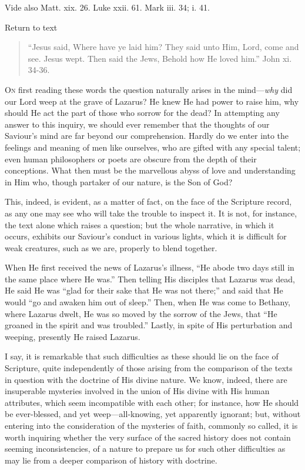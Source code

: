 
Vide also Matt. xix. 26. Luke xxii. 61. Mark iii. 34; i. 41.

Return to text


\begin{quote}

``Jesus said, Where have ye laid him? They said unto Him,
Lord, come and see. Jesus wept. Then said the Jews, Behold how He
loved him.'' John xi. 34-36.

\end{quote}

O\textsc{n} first reading these words the question naturally arises in the
mind—\emph{why} did our Lord weep at the grave of Lazarus? He knew
He had power to raise him, why should He act the part of those who
sorrow for the dead? In attempting any answer to this inquiry, we
should ever remember that the thoughts of our Saviour's mind are far
beyond our comprehension. Hardly do we enter into the feelings and
meaning of men like ourselves, who are gifted with any special talent;
even human philosophers or poets are obscure from the depth of their
conceptions. What then must be the marvellous abyss of love and
understanding in Him who, though partaker of our nature, is the Son of
God?

This, indeed, is evident, as a matter of fact, on the face of the
Scripture record, as any one may see who will take the trouble to
inspect it. It is not, for instance, the text alone which raises a
question; but the whole narrative, in which it occurs, exhibits our
Saviour's conduct in various lights, which it is difficult for weak
creatures, such as we are, properly to blend together.

When He first received the news of Lazarus's illness, ``He
abode two days still in the same place where He was.'' Then
telling His disciples that Lazarus was dead, He said He was ``glad
for their sake that He was not there;'' and said that He would
``go and awaken him out of sleep.'' Then, when He was come to
Bethany, where Lazarus dwelt, He was so moved by the sorrow of the
Jews, that ``He groaned in the spirit and was troubled.''
Lastly, in spite of His perturbation and weeping, presently He raised
Lazarus.

I say, it is remarkable that such difficulties as these should lie
on the face of Scripture, quite independently of those arising from
the comparison of the texts in question with the doctrine of His
divine nature. We know, indeed, there are insuperable mysteries
involved in the union of His divine with His human attributes, which
seem incompatible with each other; for instance, how He should be
ever-blessed, and yet weep—all-knowing, yet apparently ignorant;
but, without entering into the consideration of the mysteries of
faith, commonly so called, it is worth inquiring whether the very
surface of the sacred history does not contain seeming
inconsistencies, of a nature to prepare us for such other difficulties
as may lie from a deeper comparison of history with doctrine.

